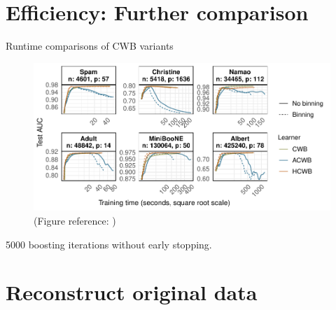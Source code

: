 \documentclass[t,10pt]{beamer}
\begin{document}
\section*{Efficiency: Further comparison}

\begin{frame}{Runtime comparisons of CWB variants}
  \begin{figure}
    \centering
    \includegraphics[width=\textwidth]{figures/fig-cacb-runtimes.pdf}
        \caption{\small(Figure reference: \citet{schalk2022accelerated})}  
    \end{figure}
  5000 boosting iterations without early stopping.
\end{frame}

\section*{Reconstruct original data}
\end{document}
